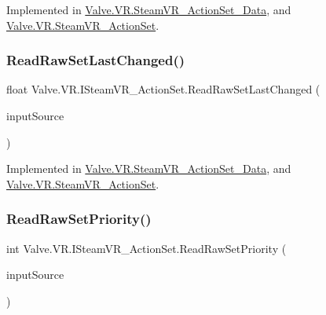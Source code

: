 Implemented in \mbox{\hyperlink{class_valve_1_1_v_r_1_1_steam_v_r___action_set___data_a24bdfaf2e0d0505b09055633ac7cfbc3}{Valve.\+V\+R.\+Steam\+V\+R\+\_\+\+Action\+Set\+\_\+\+Data}}, and \mbox{\hyperlink{class_valve_1_1_v_r_1_1_steam_v_r___action_set_a212fb34fda9aa2be57a9a78e3ca6fe0f}{Valve.\+V\+R.\+Steam\+V\+R\+\_\+\+Action\+Set}}.

\mbox{\label{interface_valve_1_1_v_r_1_1_i_steam_v_r___action_set_a7647555ffdd2708516296e140100a8ae}} 
\subsubsection{\texorpdfstring{ReadRawSetLastChanged()}{ReadRawSetLastChanged()}}
{\footnotesize\ttfamily float Valve.\+V\+R.\+I\+Steam\+V\+R\+\_\+\+Action\+Set.\+Read\+Raw\+Set\+Last\+Changed (\begin{DoxyParamCaption}\item[{\mbox{\hyperlink{namespace_valve_1_1_v_r_a82e5bf501cc3aa155444ee3f0662853f}{Steam\+V\+R\+\_\+\+Input\+\_\+\+Sources}}}]{input\+Source }\end{DoxyParamCaption})}



Implemented in \mbox{\hyperlink{class_valve_1_1_v_r_1_1_steam_v_r___action_set___data_a86331a88d9eddc152fccc295a6c090d6}{Valve.\+V\+R.\+Steam\+V\+R\+\_\+\+Action\+Set\+\_\+\+Data}}, and \mbox{\hyperlink{class_valve_1_1_v_r_1_1_steam_v_r___action_set_afc8e7c4a2dbc8e182f34ec832bfd9b22}{Valve.\+V\+R.\+Steam\+V\+R\+\_\+\+Action\+Set}}.

\mbox{\label{interface_valve_1_1_v_r_1_1_i_steam_v_r___action_set_a79f6520e36cd4bfa4ddb1388a8ff1b51}} 
\subsubsection{\texorpdfstring{ReadRawSetPriority()}{ReadRawSetPriority()}}
{\footnotesize\ttfamily int Valve.\+V\+R.\+I\+Steam\+V\+R\+\_\+\+Action\+Set.\+Read\+Raw\+Set\+Priority (\begin{DoxyParamCaption}\item[{\mbox{\hyperlink{namespace_valve_1_1_v_r_a82e5bf501cc3aa155444ee3f0662853f}{Steam\+V\+R\+\_\+\+Input\+\_\+\+Sources}}}]{input\+Source }\end{DoxyParamCaption})}



